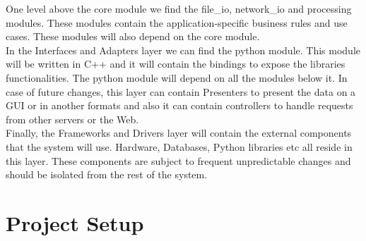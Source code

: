 \begin{spacing}{1.2}
    One level above the core module we find the file\_io, network\_io and processing modules.
    These modules contain the application-specific business rules and use cases.
    These modules will also depend on the core module.\\

    In the Interfaces and Adapters layer we can find the python module. This module will be written in C++
    and it will contain the bindings to expose the libraries functionalities. The python module
    will depend on all the modules below it. In case of future changes, this layer can contain
    Presenters to present the data on a GUI or in another formats and also it can contain
    controllers to handle requests from other servers or the Web.\\

    Finally, the Frameworks and Drivers layer will contain the external components that the system
    will use. Hardware, Databases, Python libraries etc all reside in this layer. These components
    are subject to frequent unpredictable changes and should be isolated from the rest of the
    system.\\



    \section{Project Setup}

\end{spacing}
